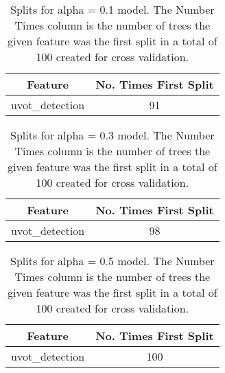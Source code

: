 \begin{table}[H]
\begin{center}
\begin{tabular}{cc}
  \hline
Feature & No. Times First Split \\ 
  \hline
uvot\_detection & 91 \\ 
   \hline
\end{tabular}
\caption{Splits for alpha = 0.1 model. The Number Times column is the number of trees the given feature was the first split in a total of 100 created for cross validation.}
\end{center}
\end{table}
\begin{table}[H]
\begin{center}
\begin{tabular}{cc}
  \hline
Feature & No. Times First Split \\ 
  \hline
uvot\_detection & 98 \\ 
   \hline
\end{tabular}
\caption{Splits for alpha = 0.3 model. The Number Times column is the number of trees the given feature was the first split in a total of 100 created for cross validation.}
\end{center}
\end{table}
\begin{table}[H]
\begin{center}
\begin{tabular}{cc}
  \hline
Feature & No. Times First Split \\ 
  \hline
uvot\_detection & 100 \\ 
   \hline
\end{tabular}
\caption{Splits for alpha = 0.5 model. The Number Times column is the number of trees the given feature was the first split in a total of 100 created for cross validation.}
\end{center}
\end{table}

